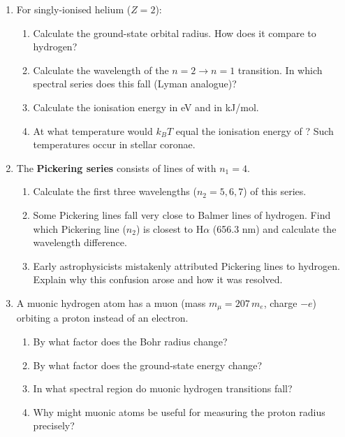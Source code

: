 \documentclass[12pt, a4paper]{book}
\begin{document}
\begin{problembox}
\begin{enumerate}[label=\textbf{\arabic*.}]
  \item For singly-ionised helium  ($Z=2$):
        \begin{enumerate}[label=(\alph*)]
          \item Calculate the ground-state orbital radius.
                How does it compare to hydrogen?
          \item Calculate the wavelength of the $n=2 \to n=1$
                transition. In which spectral series does this
                fall (Lyman analogue)?
          \item Calculate the ionisation energy in eV and in
                kJ/mol.
          \item At what temperature would $k_BT$ equal
                the ionisation energy of ?
                Such temperatures occur in stellar coronae.
        \end{enumerate}

  \item The \textbf{Pickering series} consists of lines of
         with $n_1 = 4$.
        \begin{enumerate}[label=(\alph*)]
          \item Calculate the first three wavelengths
                ($n_2 = 5, 6, 7$) of this series.
          \item Some Pickering lines fall very close to
                Balmer lines of hydrogen.
                Find which Pickering line ($n_2$) is closest
                to H$\alpha$ (656.3 nm) and calculate
                the wavelength difference.
          \item Early astrophysicists mistakenly attributed
                Pickering lines to hydrogen.
                Explain why this confusion arose and
                how it was resolved.
        \end{enumerate}

  \item A muonic hydrogen atom has a muon
        (mass $m_\mu = 207\,m_e$, charge $-e$)
        orbiting a proton instead of an electron.
        \begin{enumerate}[label=(\alph*)]
          \item By what factor does the Bohr radius change?
          \item By what factor does the ground-state energy change?
          \item In what spectral region do muonic hydrogen
                transitions fall?
          \item Why might muonic atoms be useful for measuring
                the proton radius precisely?
        \end{enumerate}
\end{enumerate}
\end{problembox}
\end{document}
